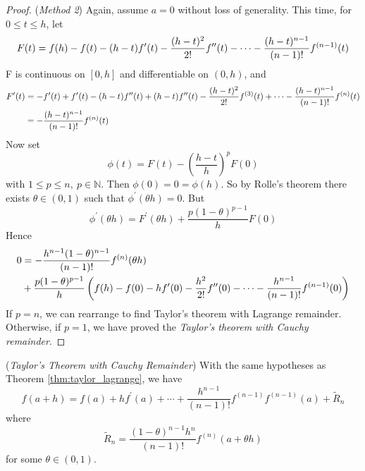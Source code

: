 \documentclass[10pt, a4paper, twoside]{report}
\begin{document}
\begin{proof}
    (\emph{Method 2}) Again, assume \(a=0\) without loss of generality. This time, for \(0\leq t\leq h\), let 
    \[F(t)=f(h)-f(t)-(h-t)f^\prime(t)-\frac{(h-t)^2}{2!}f^{\prime\prime}(t)-\cdots-\frac{(h-t)^{n-1}}{(n-1)!}f^{(n-1)}(t)\]
    F is continuous on \([0,h]\) and differentiable on \((0,h)\), and 
    \begin{align*}
        F^\prime(t)&=-f^\prime(t)+f^\prime(t)-(h-t)f^{\prime\prime}(t)+(h-t)f^{\prime\prime}(t)-\frac{(h-t)^2}{2!}f^{(3)}(t)+\cdots-\frac{(h-t)^{n-1}}{(n-1)!}f^{(n)}(t) \\
        &=-\frac{(h-t)^{n-1}}{(n-1)!}f^{(n)}(t)
    \end{align*}
    Now set 
    \[\phi(t)=F(t)-\left(\frac{h-t}{h}\right)^pF(0)\]
    with \(1\leq p\leq n,\:p\in\mathbb{N}\). Then \(\phi(0)=0=\phi(h)\). So by Rolle's theorem there exists \(\theta\in(0,1)\) such that \(\phi^\prime(\theta h)=0\). But 
    \[\phi^\prime(\theta h)=F^\prime(\theta h)+\frac{p(1-\theta)^{p-1}}{h}F(0)\]
    Hence
    \begin{align*}
        0&=-\frac{h^{n-1}(1-\theta)^{n-1}}{(n-1)!}f^{(n)}(\theta h) \\&+\frac{p(1-\theta)^{p-1}}{h}\left(f(h)-f(0)-hf^\prime(0)-\frac{h^2}{2!}f^{\prime\prime}(0)-\cdots-\frac{h^{n-1}}{(n-1)!}f^{(n-1)}(0)\right)        
    \end{align*}
    If \(p=n\), we can rearrange to find Taylor's theorem with Lagrange remainder. Otherwise, if \(p=1\), we have proved the \emph{Taylor's theorem with Cauchy remainder}.
\end{proof}
\begin{theorem}
    (\emph{Taylor's Theorem with Cauchy Remainder}) With the same hypotheses as Theorem \ref{thm:taylor_lagrange}, we have 
    \[f(a+h)=f(a)+hf^\prime(a)+\cdots+\frac{h^{n-1}}{(n-1)!}f^{(n-1)}f^{(n-1)}(a)+\tilde{R}_n\]
    where 
    \[\tilde{R}_n=\frac{(1-\theta)^{n-1}h^n}{(n-1)!}f^{(n)}(a+\theta h)\]
    for some \(\theta\in(0,1)\).
    \label{thm:taylor_cauchy}
\end{theorem}
\end{document}
